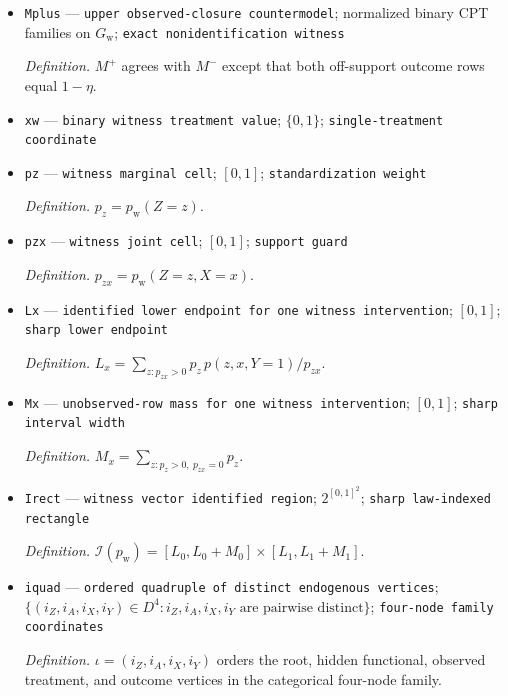 \documentclass{article}
\begin{document}
\begin{itemize}
  \par\smallskip\noindent\emph{Definition.} \(M^-\) has \(P(Z=1)=\lambda\), \(P(A=1\mid Z=z)=\alpha_z\), \(X=A\), reached outcome rows \(P(Y=1\mid A=a,X=a)=r_a\), and both off-support rows \(P(Y=1\mid A=1,X=0)=P(Y=1\mid A=0,X=1)=\eta\).
  \item \texttt{Mplus} --- \texttt{upper observed-\allowbreak{}closure countermodel}; normalized binary CPT families on \(G_{\mathrm w}\); \texttt{exact nonidentification witness}
  \par\smallskip\noindent\emph{Definition.} \(M^+\) agrees with \(M^-\) except that both off-support outcome rows equal \(1-\eta\).
  \item \texttt{xw} --- \texttt{binary witness treatment value}; \(\{0,1\}\); \texttt{single-\allowbreak{}treatment coordinate}
  \item \texttt{pz} --- \texttt{witness marginal cell}; \([0,1]\); \texttt{standardization weight}
  \par\smallskip\noindent\emph{Definition.} \(p_z=p_{\mathrm w}(Z=z)\).
  \item \texttt{pzx} --- \texttt{witness joint cell}; \([0,1]\); \texttt{support guard}
  \par\smallskip\noindent\emph{Definition.} \(p_{zx}=p_{\mathrm w}(Z=z,X=x)\).
  \item \texttt{Lx} --- \texttt{identified lower endpoint for one witness intervention}; \([0,1]\); \texttt{sharp lower endpoint}
  \par\smallskip\noindent\emph{Definition.} \(L_x=\sum_{z:p_{zx}>0}p_z\,p(z,x,Y=1)/p_{zx}\).
  \item \texttt{Mx} --- \texttt{unobserved-\allowbreak{}row mass for one witness intervention}; \([0,1]\); \texttt{sharp interval width}
  \par\smallskip\noindent\emph{Definition.} \(M_x=\sum_{z:p_z>0,\ p_{zx}=0}p_z\).
  \item \texttt{Irect} --- \texttt{witness vector identified region}; \(2^{[0,1]^2}\); \texttt{sharp law-\allowbreak{}indexed rectangle}
  \par\smallskip\noindent\emph{Definition.} \(\mathcal I(p_{\mathrm w})=[L_0,L_0+M_0]\times[L_1,L_1+M_1]\).
  \item \texttt{iquad} --- \texttt{ordered quadruple of distinct endogenous vertices}; \(\{(i_Z,i_A,i_X,i_Y)\in D^4:i_Z,i_A,i_X,i_Y\text{ are pairwise distinct}\}\); \texttt{four-\allowbreak{}node family coordinates}
  \par\smallskip\noindent\emph{Definition.} \(\iota=(i_Z,i_A,i_X,i_Y)\) orders the root, hidden functional, observed treatment, and outcome vertices in the categorical four-node family.

\end{itemize}
\end{document}
